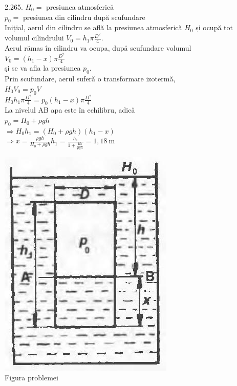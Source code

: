 2.265. $H_{0}=$ presiunea atmosferică\\ $p_{0}=$ presiunea din cilindru după scufundare\\ Inițial, aerul din cilindru se află la presiunea atmosferică $H_{0}$ și ocupă tot\\ volumul cilindrului $V_{0}=h_{1} \pi \frac{D^{2}}{4}$.\\ Aerul rămas în cilindru va ocupa, după scufundare volumul\\ $V_{0}=\left(h_{1}-x\right) \pi \frac{D^{2}}{4}$\\ şi se va afla la presiunea $p_{0}$.\\ Prin scufundare, aerul suferă o transformare izotermă,\\ $H_{0} V_{0}=p_{0} V$\\ $H_{0} h_{1} \pi \frac{D^{2}}{4}=p_{0}\left(h_{1}-x\right) \pi \frac{D^{2}}{4}$\\ La nivelul AB apa este în echilibru, adică\\ $p_{0}=H_{0}+\rho g h$\\ $\Rightarrow H_{0} h_{1}=\left(H_{0}+\rho g h\right)\left(h_{1}-x\right)$\\ $\Rightarrow x=\frac{\rho g h}{H_{0}+\rho g h} h_{1}=\frac{h_{1}}{1+\frac{H_{0}}{\rho g h}}=1,18 \mathrm{~m}$\\ \begin{center} \includegraphics[width=0.4\linewidth]{images/2025_07_01_5b3ff9fa0d508c8e9f17g-328}\\ Figura problemei \end{center}\\

